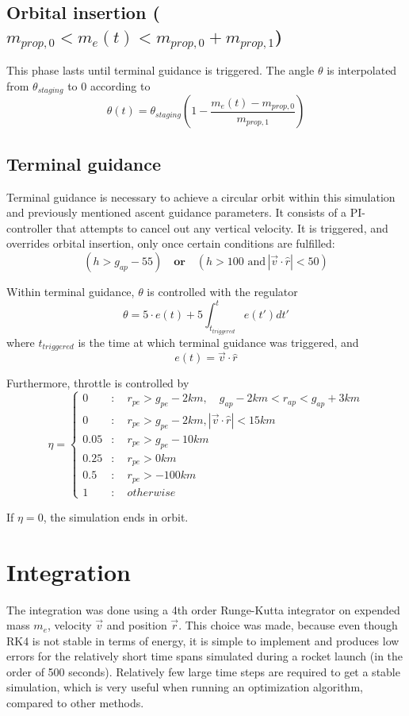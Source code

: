 \documentclass[11pt]{article}
\begin{document}
\subsection{Orbital insertion ($m_{prop,0} < m_e(t) < m_{prop,0} + m_{prop,1}$)}
This phase lasts until terminal guidance is triggered. The angle $\theta$ is interpolated from $\theta_{staging}$ to 0 according to
$$
\theta(t) = \theta_{staging} \left( 1 - \frac{m_e(t) - m_{prop,0}}{m_{prop,1}} \right)
$$

\subsection{Terminal guidance}
Terminal guidance is necessary to achieve a circular orbit within this simulation and previously mentioned ascent guidance parameters.
It consists of a PI-controller that attempts to cancel out any vertical velocity.
It is triggered, and overrides orbital insertion, only once certain conditions are fulfilled:
$$
\left( h > g_{ap} - 55  \right) \quad \textbf{or} \quad \left(  h > 100 \,\, \text{and} \, \left| \vec{v} \cdot \hat{r} \right| < 50 \right)
$$

Within terminal guidance, $\theta$ is controlled with the regulator 
$$
\theta = 5 \cdot e(t) + 5 \int_{t_{triggered}}^t e(t') dt'
$$
where $t_{triggered}$ is the time at which terminal guidance was triggered, and
$$
e(t) = \vec{v} \cdot \hat{r}
$$

Furthermore, throttle is controlled by
$$
\eta = \begin{cases}
0 & : \quad r_{pe} > g_{pe} - 2 km, \quad g_{ap} - 2 km < r_{ap} < g_{ap} + 3 km \\
0 & : \quad r_{pe} > g_{pe} - 2 km, \left| \vec{v} \cdot \hat{r} \right| < 15 km \\
0.05 & : \quad r_{pe} > g_{pe} - 10 km \\
0.25 & : \quad r_{pe} > 0 km \\
0.5 & : \quad r_{pe} > -100 km \\
1 & :  \quad otherwise
\end{cases}
$$

If $\eta = 0$, the simulation ends in orbit.

\section{Integration}
The integration was done using a 4th order Runge-Kutta integrator on expended mass $m_e$, velocity $\vec{v}$ and position $\vec{r}$. 
This choice was made, because even though RK4 is not stable in terms of energy, it is simple to implement and produces low errors for the relatively short time spans simulated during a rocket launch (in the order of 500 seconds).
Relatively few large time steps are required to get a stable simulation, which is very useful when running an optimization algorithm, compared to other methods.
\end{document}
